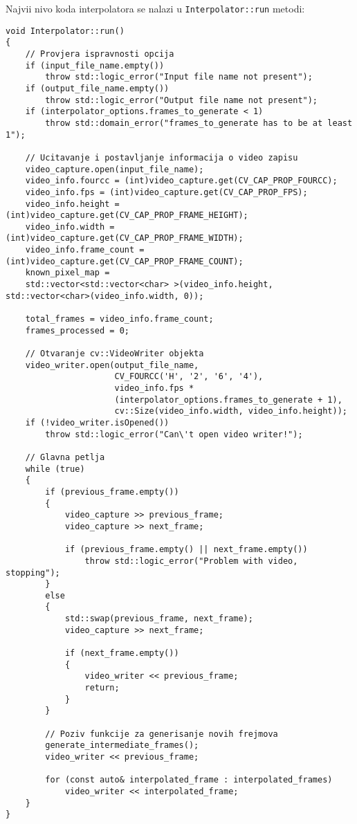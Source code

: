Najvi\sh i nivo koda interpolatora se nalazi u \lstinline{Interpolator::run} metodi:
\begin{lstlisting}
void Interpolator::run()
{
    // Provjera ispravnosti opcija
    if (input_file_name.empty())
        throw std::logic_error("Input file name not present");
    if (output_file_name.empty())
        throw std::logic_error("Output file name not present");
    if (interpolator_options.frames_to_generate < 1)
        throw std::domain_error("frames_to_generate has to be at least 1");
        
    // Ucitavanje i postavljanje informacija o video zapisu   
    video_capture.open(input_file_name);
    video_info.fourcc = (int)video_capture.get(CV_CAP_PROP_FOURCC);
    video_info.fps = (int)video_capture.get(CV_CAP_PROP_FPS);
    video_info.height = (int)video_capture.get(CV_CAP_PROP_FRAME_HEIGHT);
    video_info.width = (int)video_capture.get(CV_CAP_PROP_FRAME_WIDTH);
    video_info.frame_count = (int)video_capture.get(CV_CAP_PROP_FRAME_COUNT);
    known_pixel_map = 
    std::vector<std::vector<char> >(video_info.height, std::vector<char>(video_info.width, 0));

    total_frames = video_info.frame_count;
    frames_processed = 0;

    // Otvaranje cv::VideoWriter objekta
    video_writer.open(output_file_name, 
                      CV_FOURCC('H', '2', '6', '4'),
                      video_info.fps * 
                      (interpolator_options.frames_to_generate + 1), 
                      cv::Size(video_info.width, video_info.height));
    if (!video_writer.isOpened())
        throw std::logic_error("Can\'t open video writer!");

    // Glavna petlja
    while (true)
    {
        if (previous_frame.empty())
        {
            video_capture >> previous_frame;
            video_capture >> next_frame;

            if (previous_frame.empty() || next_frame.empty())
                throw std::logic_error("Problem with video, stopping");
        }
        else
        {
            std::swap(previous_frame, next_frame);
            video_capture >> next_frame;

            if (next_frame.empty())
            {
                video_writer << previous_frame;
                return; 
            }
        }

        // Poziv funkcije za generisanje novih frejmova
        generate_intermediate_frames();
        video_writer << previous_frame;

        for (const auto& interpolated_frame : interpolated_frames)
            video_writer << interpolated_frame;
    }
}
\end{lstlisting}

